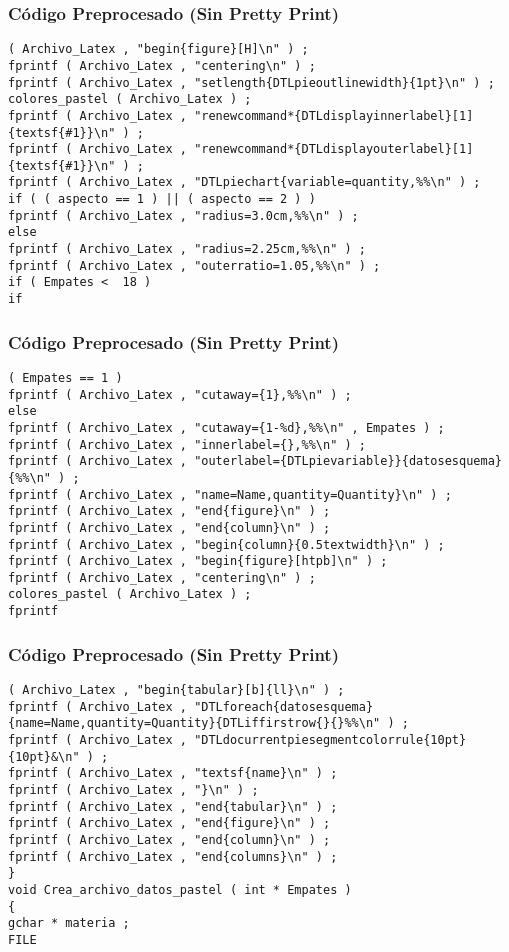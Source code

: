 \documentclass{beamer}
\begin{document}
\begin{frame}[fragile]
\frametitle{C\'odigo Preprocesado (Sin Pretty Print)}
\begin{lstlisting}[style=CStyle]
( Archivo_Latex , "begin{figure}[H]\n" ) ; 
fprintf ( Archivo_Latex , "centering\n" ) ; 
fprintf ( Archivo_Latex , "setlength{DTLpieoutlinewidth}{1pt}\n" ) ; 
colores_pastel ( Archivo_Latex ) ; 
fprintf ( Archivo_Latex , "renewcommand*{DTLdisplayinnerlabel}[1]{textsf{#1}}\n" ) ; 
fprintf ( Archivo_Latex , "renewcommand*{DTLdisplayouterlabel}[1]{textsf{#1}}\n" ) ; 
fprintf ( Archivo_Latex , "DTLpiechart{variable=quantity,%%\n" ) ; 
if ( ( aspecto == 1 ) || ( aspecto == 2 ) ) 
fprintf ( Archivo_Latex , "radius=3.0cm,%%\n" ) ; 
else 
fprintf ( Archivo_Latex , "radius=2.25cm,%%\n" ) ; 
fprintf ( Archivo_Latex , "outerratio=1.05,%%\n" ) ; 
if ( Empates <  18 ) 
if \end{lstlisting}
\end{frame}
\begin{frame}[fragile]
\frametitle{C\'odigo Preprocesado (Sin Pretty Print)}
\begin{lstlisting}[style=CStyle]
( Empates == 1 ) 
fprintf ( Archivo_Latex , "cutaway={1},%%\n" ) ; 
else 
fprintf ( Archivo_Latex , "cutaway={1-%d},%%\n" , Empates ) ; 
fprintf ( Archivo_Latex , "innerlabel={},%%\n" ) ; 
fprintf ( Archivo_Latex , "outerlabel={DTLpievariable}}{datosesquema}{%%\n" ) ; 
fprintf ( Archivo_Latex , "name=Name,quantity=Quantity}\n" ) ; 
fprintf ( Archivo_Latex , "end{figure}\n" ) ; 
fprintf ( Archivo_Latex , "end{column}\n" ) ; 
fprintf ( Archivo_Latex , "begin{column}{0.5textwidth}\n" ) ; 
fprintf ( Archivo_Latex , "begin{figure}[htpb]\n" ) ; 
fprintf ( Archivo_Latex , "centering\n" ) ; 
colores_pastel ( Archivo_Latex ) ; 
fprintf \end{lstlisting}
\end{frame}
\begin{frame}[fragile]
\frametitle{C\'odigo Preprocesado (Sin Pretty Print)}
\begin{lstlisting}[style=CStyle]
( Archivo_Latex , "begin{tabular}[b]{ll}\n" ) ; 
fprintf ( Archivo_Latex , "DTLforeach{datosesquema}{name=Name,quantity=Quantity}{DTLiffirstrow{}{}%%\n" ) ; 
fprintf ( Archivo_Latex , "DTLdocurrentpiesegmentcolorrule{10pt}{10pt}&\n" ) ; 
fprintf ( Archivo_Latex , "textsf{name}\n" ) ; 
fprintf ( Archivo_Latex , "}\n" ) ; 
fprintf ( Archivo_Latex , "end{tabular}\n" ) ; 
fprintf ( Archivo_Latex , "end{figure}\n" ) ; 
fprintf ( Archivo_Latex , "end{column}\n" ) ; 
fprintf ( Archivo_Latex , "end{columns}\n" ) ; 
} 
void Crea_archivo_datos_pastel ( int * Empates ) 
{ 
gchar * materia ; 
FILE \end{lstlisting}
\end{frame}
\end{document}

